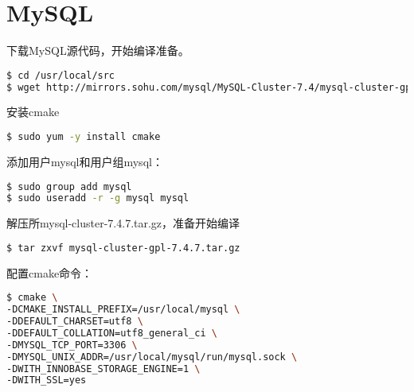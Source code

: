 \begin{lstlisting}[language=bash]

\end{lstlisting}




\begin{lstlisting}[language=bash]

\end{lstlisting}




\begin{lstlisting}[language=bash]

\end{lstlisting}




\section{MySQL}



下载MySQL源代码，开始编译准备。



\begin{lstlisting}[language=bash]
$ cd /usr/local/src
$ wget http://mirrors.sohu.com/mysql/MySQL-Cluster-7.4/mysql-cluster-gpl-7.4.7.tar.gz
\end{lstlisting}

安装cmake

\begin{lstlisting}[language=bash]
$ sudo yum -y install cmake
\end{lstlisting}

添加用户mysql和用户组mysql：


\begin{lstlisting}[language=bash]
$ sudo group add mysql
$ sudo useradd -r -g mysql mysql
\end{lstlisting}

解压所mysql-cluster-7.4.7.tar.gz，准备开始编译


\begin{lstlisting}[language=bash]
$ tar zxvf mysql-cluster-gpl-7.4.7.tar.gz
\end{lstlisting}

配置cmake命令：


\begin{lstlisting}[language=bash]
$ cmake \
-DCMAKE_INSTALL_PREFIX=/usr/local/mysql \
-DDEFAULT_CHARSET=utf8 \
-DDEFAULT_COLLATION=utf8_general_ci \
-DMYSQL_TCP_PORT=3306 \
-DMYSQL_UNIX_ADDR=/usr/local/mysql/run/mysql.sock \
-DWITH_INNOBASE_STORAGE_ENGINE=1 \
-DWITH_SSL=yes
\end{lstlisting}


